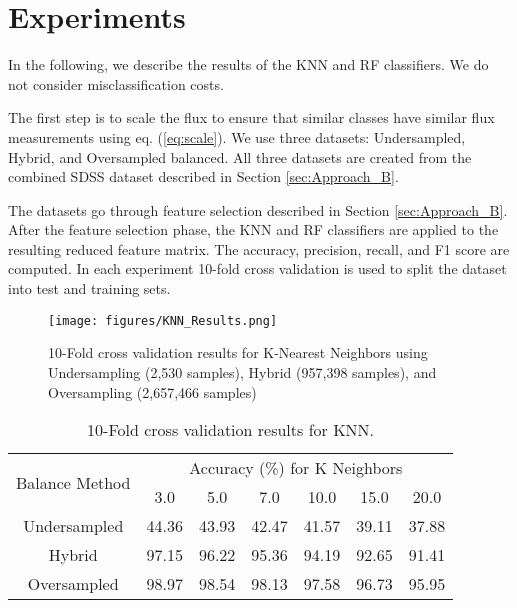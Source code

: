 \documentclass[./AutomatedMK.tex]{subfiles}
\begin{document}
\section{Experiments}\label{sec:exp}

In the following, we describe the results of the KNN and RF classifiers. We do not consider misclassification costs.

    	The first step is to scale the flux to ensure that similar classes have similar flux measurements using eq. (\ref{eq:scale}). We use three datasets: Undersampled, Hybrid, and Oversampled balanced. All three datasets are created from the combined SDSS dataset described in Section \ref{sec:Approach_B}.

The datasets go through feature selection described in Section \ref{sec:Approach_B}. After the feature selection phase, the KNN and RF classifiers are applied to the resulting reduced feature matrix. The accuracy, precision, recall, and F1 score are computed. In each experiment 10-fold cross validation is used to split the dataset into test and training sets. 

        \begin{figure}
            \centering
            \texttt{[image: figures/KNN\_Results.png]}
            \caption{10-Fold cross validation results for K-Nearest Neighbors using Undersampling (2,530 samples), Hybrid (957,398 samples), and Oversampling (2,657,466 samples)}
            \label{fig:KNNR}
        \end{figure}

\begin{table*}
\centering
\caption{10-Fold cross validation results for KNN.}
\label{tab:KNN}

\begin{tabular}{|c|c|c|c|c|c|c|}
\hline
\multirow{2}{*}{Balance Method} & \multicolumn{6}{c|}{Accuracy (\%) for K Neighbors} \\       
&   3.0 &   5.0 &   7.0 &   10.0 &   15.0 &   20.0 \\ \hline
 Undersampled & 44.36 & 43.93 & 42.47 &  41.57 &  39.11 &  37.88 \\ \hline
 Hybrid       & 97.15 & 96.22 & 95.36 &  94.19 &  92.65 &  91.41 \\ \hline
 Oversampled  & 98.97 & 98.54 & 98.13 &  97.58 &  96.73 &  95.95 \\ \hline
\end{tabular}
\end{table*}
\end{document}
